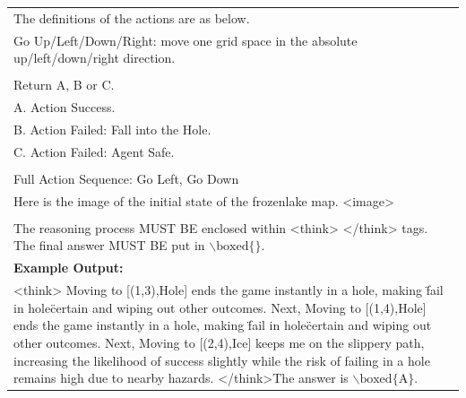 \begin{table}[htbp]
{\begin{tabular}{p{\linewidth}}
        \\
        The definitions of the actions are as below.\\
        Go Up/Left/Down/Right: move one grid space in the absolute up/left/down/right direction.\\
        \\
        Return A, B or C.\\
        A. Action Success.\\
        B. Action Failed: Fall into the Hole.\\
        C. Action Failed: Agent Safe.\\
        \\
        Full Action Sequence: Go Left, Go Down\\
        Here is the image of the initial state of the frozenlake map. <image> \\
        \\
        The reasoning process MUST BE enclosed within <think> </think> tags. The final answer MUST BE put in $\backslash \text{boxed}\{\}$.\\
        \midrule
        \textbf{Example Output:} \\
        <think> Moving to [(1,3),Hole] ends the game instantly in a hole, making \"fail in hole\" certain and wiping out other outcomes. Next, Moving to [(1,4),Hole] ends the game instantly in a hole, making \"fail in hole\" certain and wiping out other outcomes. Next, Moving to [(2,4),Ice] keeps me on the slippery path, increasing the likelihood of success slightly while the risk of failing in a hole remains high due to nearby hazards. </think>The answer is $\backslash \text{boxed}\{\text{A}\}$.\\
        \bottomrule
    \end{tabular}
    }
    \label{tab:data-example-simulation}
\end{table}



